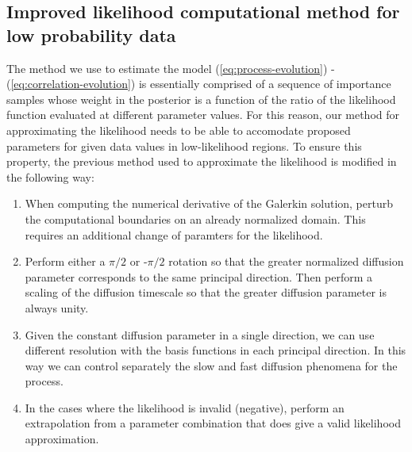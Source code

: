 \documentclass[10pt]{article}
\begin{document}
\subsection{Improved likelihood computational method for low probability data}
The method we use to estimate the model
(\ref{eq:process-evolution}) - (\ref{eq:correlation-evolution}) is
essentially comprised of a sequence of importance samples whose weight
in the posterior is a function of the ratio of the likelihood function
evaluated at different parameter values. For this reason, our method
for approximating the likelihood needs to be able to accomodate
proposed parameters for given data values in low-likelihood
regions. To ensure this property, the previous method used to
approximate the likelihood is modified in the following way:
\begin{enumerate}
\item When computing the numerical derivative of the Galerkin
  solution, perturb the computational boundaries on an already
  normalized domain. This requires an additional change of paramters
  for the likelihood.

\item Perform either a $\pi/2$ or -$\pi/2$ rotation so that the
  greater normalized diffusion parameter corresponds to the same
  principal direction. Then perform a scaling of the diffusion
  timescale so that the greater diffusion parameter is always unity.

\item Given the constant diffusion parameter in a single direction, we
  can use different resolution with the basis functions in each
  principal direction. In this way we can control separately the slow
  and fast diffusion phenomena for the process.

\item In the cases where the likelihood is invalid (negative), perform
  an extrapolation from a parameter combination that does give a valid
  likelihood approximation.
\end{enumerate}
\end{document}
